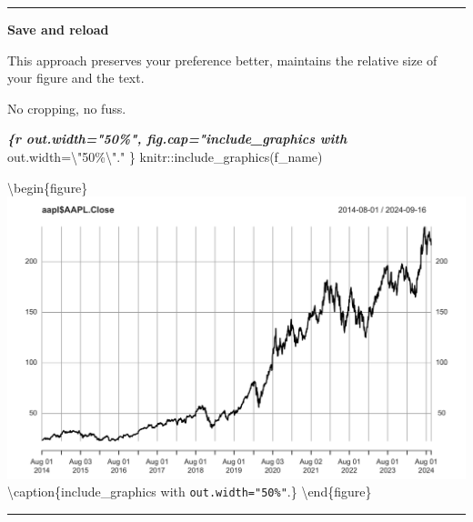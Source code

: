 \documentclass[
  a4paper,
  twoside,
  openright]{book}
\newenvironment{Shaded}{\begin{snugshade}}{\end{snugshade}}
\newcommand{\AttributeTok}[1]{\textcolor[rgb]{0.13,0.29,0.53}{#1}}
\newcommand{\DecValTok}[1]{\textcolor[rgb]{0.00,0.00,0.81}{#1}}
\newcommand{\FunctionTok}[1]{\textcolor[rgb]{0.13,0.29,0.53}{\textbf{#1}}}
\newcommand{\InformationTok}[1]{\textcolor[rgb]{0.56,0.35,0.01}{\textbf{\textit{#1}}}}
\newcommand{\NormalTok}[1]{#1}
\newcommand{\OtherTok}[1]{\textcolor[rgb]{0.56,0.35,0.01}{#1}}
\newcommand{\SpecialCharTok}[1]{\textcolor[rgb]{0.81,0.36,0.00}{\textbf{#1}}}
\newcommand{\StringTok}[1]{\textcolor[rgb]{0.31,0.60,0.02}{#1}}
\theoremstyle{definition}
\theoremstyle{definition}
\theoremstyle{definition}
\theoremstyle{definition}
\theoremstyle{remark}
\begin{document}
\begin{center}\rule{0.5\linewidth}{0.5pt}\end{center}

\textbf{Save and reload}

This approach preserves your preference better, maintains the relative size of your figure and the text.

No cropping, no fuss.

\begin{Shaded}
\end{Shaded}

\begin{Shaded}
\begin{Highlighting}[]
\NormalTok{\textasciigrave{}\textasciigrave{}}\InformationTok{\textasciigrave{}\{r out.width="50\%", fig.cap="include\_graphics with \textasciigrave{}}\NormalTok{out.width=\textbackslash{}"50\%\textbackslash{}"\textasciigrave{}." \}}
\NormalTok{knitr::include\_graphics(f\_name) }
\InformationTok{\textasciigrave{}\textasciigrave{}\textasciigrave{}}
\end{Highlighting}
\end{Shaded}

\textbackslash begin\{figure\}
\includegraphics[width=0.5\linewidth]{images/aapl} \textbackslash caption\{include\_graphics with \texttt{out.width="50\%"}.\}\label{fig:unnamed-chunk-6}
\textbackslash end\{figure\}

\begin{center}\rule{0.5\linewidth}{0.5pt}\end{center}
\end{document}
